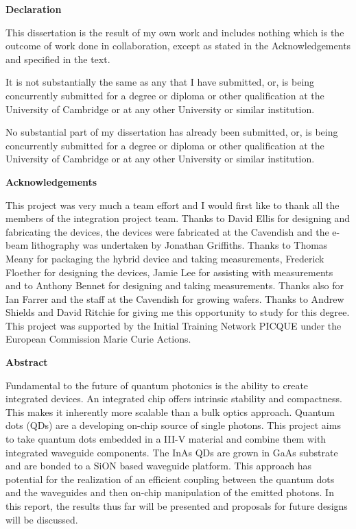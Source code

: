 \documentclass[12pt, oneside]{book}
\begin{document}
\title{}  \author{} \date{}
\maketitle

\begin{center} \large \textbf{Declaration} \end{center}

This dissertation is the result of my own work and includes nothing which is the
outcome of work done in collaboration, except as stated in the Acknowledgements
and specified in the text.

It is not substantially the same as any that I have submitted, or, is being concurrently
submitted for a degree or diploma or other qualification at the University of Cambridge
or at any other University or similar institution.

No substantial part of my dissertation has already been submitted, or, is being concurrently
submitted for a degree or diploma or other qualification at the University of Cambridge
or at any other University or similar institution.

\begin{center} \large \textbf{Acknowledgements} \end{center}

This project was very much a team effort and I would first like to thank all the
members of the integration project team. Thanks to David Ellis for designing and
fabricating the devices, the devices were fabricated at the Cavendish and the
e-beam lithography was undertaken by Jonathan Griffiths. Thanks to Thomas Meany
for packaging the hybrid device and taking measurements, Frederick Floether for
designing the devices, Jamie Lee for assisting with measurements and to Anthony
Bennet for designing and taking measurements. Thanks also for Ian Farrer and the
staff at the Cavendish for growing wafers. Thanks to Andrew Shields and David
Ritchie for giving me this opportunity to study for this degree. This project was
supported by the Initial Training Network PICQUE under the European Commission
Marie Curie Actions.

\newpage \begin{center} \large \textbf{Abstract} \end{center}

Fundamental to the future of quantum photonics is the ability to create
integrated devices. An integrated chip offers intrinsic stability and
compactness. This makes it inherently more scalable than a bulk optics approach.
Quantum dots (QDs) are a developing on-chip source of single photons. This
project aims to take quantum dots embedded in a III-V material and combine them
with integrated waveguide components. The InAs QDs are grown in GaAs substrate
and are bonded to a SiON based waveguide platform. This approach has potential
for the realization of an efficient coupling between the quantum dots and the
waveguides and then on-chip manipulation of the emitted photons. In this report,
the results thus far will be presented and proposals for future designs will be
discussed.
\end{document}

